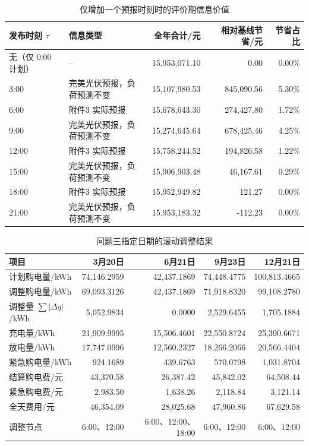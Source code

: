\begin{table}[H]
  \centering
  \caption{仅增加一个预报时刻时的评价期信息价值}
  \label{tab:q3-fv}
  \small
  \begin{tabular}{llrrr}
    \toprule
    发布时刻 $\tau$ & 信息类型 & 全年合计/元 & 相对基线节省/元 & 节省占比 \\
    \midrule
    无（仅 0:00 计划） & -- & 15,953,071.10 & 0.00 & 0.00\% \\
    \midrule
    3:00 & 完美光伏预报，负荷预测不变 & 15,107,980.53 & 845,090.56 & 5.30\% \\
    6:00 & 附件3 实际预报 & 15,678,643.30 & 274,427.80 & 1.72\% \\
    9:00 & 完美光伏预报，负荷预测不变 & 15,274,645.64 & 678,425.46 & 4.25\% \\
    12:00 & 附件3 实际预报 & 15,758,244.52 & 194,826.58 & 1.22\% \\
    15:00 & 完美光伏预报，负荷预测不变 & 15,906,903.48 & 46,167.61 & 0.29\% \\
    18:00 & 附件3 实际预报 & 15,952,949.82 & 121.27 & 0.00\% \\
    21:00 & 完美光伏预报，负荷预测不变 & 15,953,183.32 & -112.23 & 0.00\% \\
    \bottomrule
  \end{tabular}
\end{table}

\begin{table}[H]
  \centering
  \caption{问题三指定日期的滚动调整结果}
  \label{tab:q3-dates}
  \small
  \begin{tabular}{lrrrr}
    \toprule
    项目 & 3月20日 & 6月21日 & 9月23日 & 12月21日 \\
    \midrule
    计划购电量/kWh & 74,146.2959 & 42,437.1869 & 74,448.4775 & 100,813.4665 \\
    调整购电量/kWh & 69,093.3126 & 42,437.1869 & 71,918.8320 & 99,108.2780 \\
    调整量 $\sum|\Delta q|$/kWh & 5,052.9834 & 0.0000 & 2,529.6455 & 1,705.1884 \\
    充电量/kWh & 21,909.9995 & 15,506.4601 & 22,550.8724 & 25,390.6671 \\
    放电量/kWh & 17,747.0996 & 12,560.2327 & 18,266.2066 & 20,566.4404 \\
    紧急购电量/kWh & 924.1689 & 439.6763 & 570.0798 & 1,031.8704 \\
    结算购电费/元 & 43,370.58 & 26,387.42 & 45,842.02 & 64,508.44 \\
    紧急购电费/元 & 2,983.50 & 1,638.26 & 2,118.84 & 3,121.14 \\
    全天费用/元 & 46,354.09 & 28,025.68 & 47,960.86 & 67,629.58 \\
    \midrule
    调整节点 & 6:00、12:00 & 6:00、12:00、18:00 & 6:00、12:00 & 6:00、12:00 \\
    \bottomrule
  \end{tabular}
\end{table}